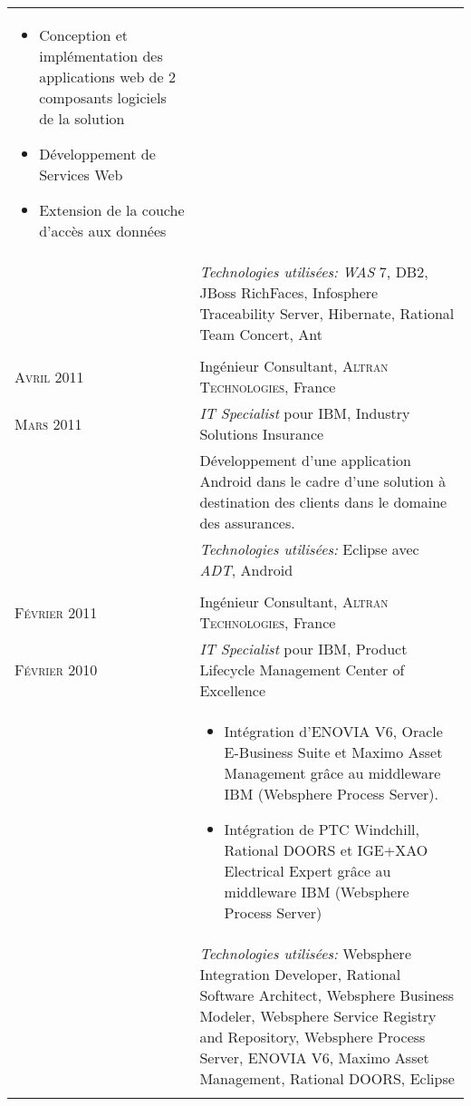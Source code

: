 \begin{longtable}{R{2.5cm}|p{14.8cm}}
{\begin{itemize}
			\item Conception et implémentation des applications web de 2 composants logiciels de la solution
			\item Développement de Services Web
			\item Extension de la couche d'accès aux données
		\end{itemize}
		\vspace{-1em}
	}\\&
 	\footnotesize{\emph{Technologies utilisées:} \emph{WAS} 7, DB2, JBoss RichFaces, Infosphere Traceability Server, Hibernate, Rational Team Concert, Ant}\\
  \\
 	\textsc{Avril 2011} & Ingénieur Consultant, \textsc{Altran Technologies}, France\\
 	\textsc{Mars 2011}& \emph{IT Specialist} pour IBM, Industry Solutions Insurance\\&
 	\footnotesize{Développement d'une application Android dans le cadre d'une solution à destination 
 	des clients dans le domaine des assurances.}\\&
 	\footnotesize{\emph{Technologies utilisées:} Eclipse avec \emph{ADT}, Android}\\
  \\
  \pagebreak[4]
 	\textsc{Février 2011} & Ingénieur Consultant, \textsc{Altran Technologies}, France\\
 	\textsc{Février 2010}& \emph{IT Specialist} pour IBM, Product Lifecycle Management Center of Excellence\\&
 	\footnotesize{
 		\begin{itemize}
 			\item Intégration d'ENOVIA V6, Oracle E-Business Suite et Maximo Asset Management grâce au middleware IBM (Websphere Process Server).
 			\item Intégration de PTC Windchill, Rational DOORS et IGE+XAO Electrical Expert grâce au middleware IBM (Websphere Process Server)
 		\end{itemize}
 		\vspace{-1em}
 	}\\&
 	\footnotesize{\emph{Technologies utilisées:} Websphere Integration Developer, Rational Software Architect, Websphere Business Modeler, Websphere Service Registry and Repository, 
 	Websphere Process Server, ENOVIA V6, Maximo Asset Management, Rational DOORS, Eclipse }\\
  \\

\end{longtable}
